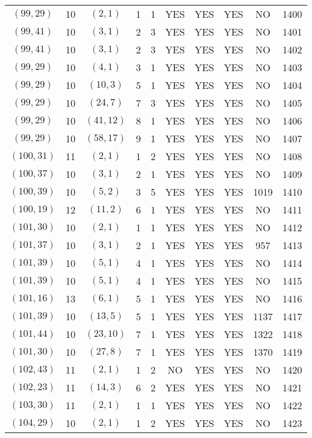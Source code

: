 \begin{longtable}{|c|c|c|c|c|c|c|c|c|c|}
$(99, 29)$ & 10 & $(2, 1)$ & 1 & 1 & YES & YES & YES & NO & 1400\\
$(99, 41)$ & 10 & $(3, 1)$ & 2 & 3 & YES & YES & YES & NO & 1401\\
$(99, 41)$ & 10 & $(3, 1)$ & 2 & 3 & YES & YES & YES & NO & 1402\\
$(99, 29)$ & 10 & $(4, 1)$ & 3 & 1 & YES & YES & YES & NO & 1403\\
$(99, 29)$ & 10 & $(10, 3)$ & 5 & 1 & YES & YES & YES & NO & 1404\\
$(99, 29)$ & 10 & $(24, 7)$ & 7 & 3 & YES & YES & YES & NO & 1405\\
$(99, 29)$ & 10 & $(41, 12)$ & 8 & 1 & YES & YES & YES & NO & 1406\\
$(99, 29)$ & 10 & $(58, 17)$ & 9 & 1 & YES & YES & YES & NO & 1407\\
$(100, 31)$ & 11 & $(2, 1)$ & 1 & 2 & YES & YES & YES & NO & 1408\\
$(100, 37)$ & 10 & $(3, 1)$ & 2 & 1 & YES & YES & YES & NO & 1409\\
$(100, 39)$ & 10 & $(5, 2)$ & 3 & 5 & YES & YES & YES & 1019 & 1410\\
$(100, 19)$ & 12 & $(11, 2)$ & 6 & 1 & YES & YES & YES & NO & 1411\\
$(101, 30)$ & 10 & $(2, 1)$ & 1 & 1 & YES & YES & YES & NO & 1412\\
$(101, 37)$ & 10 & $(3, 1)$ & 2 & 1 & YES & YES & YES & 957 & 1413\\
$(101, 39)$ & 10 & $(5, 1)$ & 4 & 1 & YES & YES & YES & NO & 1414\\
$(101, 39)$ & 10 & $(5, 1)$ & 4 & 1 & YES & YES & YES & NO & 1415\\
$(101, 16)$ & 13 & $(6, 1)$ & 5 & 1 & YES & YES & YES & NO & 1416\\
$(101, 39)$ & 10 & $(13, 5)$ & 5 & 1 & YES & YES & YES & 1137 & 1417\\
$(101, 44)$ & 10 & $(23, 10)$ & 7 & 1 & YES & YES & YES & 1322 & 1418\\
$(101, 30)$ & 10 & $(27, 8)$ & 7 & 1 & YES & YES & YES & 1370 & 1419\\
$(102, 43)$ & 11 & $(2, 1)$ & 1 & 2 & NO & YES & YES & NO & 1420\\
$(102, 23)$ & 11 & $(14, 3)$ & 6 & 2 & YES & YES & YES & NO & 1421\\
$(103, 30)$ & 11 & $(2, 1)$ & 1 & 1 & YES & YES & YES & NO & 1422\\
$(104, 29)$ & 10 & $(2, 1)$ & 1 & 2 & YES & YES & YES & NO & 1423\\

\end{longtable}
